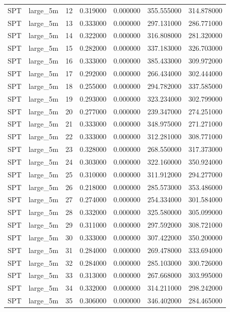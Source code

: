 \begin{tabular}{llrrrrr}
SPT & large_5m & 12 & 0.319000 & 0.000000 & 355.555000 & 314.878000 \\
SPT & large_5m & 13 & 0.333000 & 0.000000 & 297.131000 & 286.771000 \\
SPT & large_5m & 14 & 0.322000 & 0.000000 & 316.808000 & 281.320000 \\
SPT & large_5m & 15 & 0.282000 & 0.000000 & 337.183000 & 326.703000 \\
SPT & large_5m & 16 & 0.333000 & 0.000000 & 385.433000 & 309.972000 \\
SPT & large_5m & 17 & 0.292000 & 0.000000 & 266.434000 & 302.444000 \\
SPT & large_5m & 18 & 0.255000 & 0.000000 & 294.782000 & 337.585000 \\
SPT & large_5m & 19 & 0.293000 & 0.000000 & 323.234000 & 302.799000 \\
SPT & large_5m & 20 & 0.277000 & 0.000000 & 239.347000 & 274.251000 \\
SPT & large_5m & 21 & 0.333000 & 0.000000 & 348.975000 & 271.271000 \\
SPT & large_5m & 22 & 0.333000 & 0.000000 & 312.281000 & 308.771000 \\
SPT & large_5m & 23 & 0.328000 & 0.000000 & 268.550000 & 317.373000 \\
SPT & large_5m & 24 & 0.303000 & 0.000000 & 322.160000 & 350.924000 \\
SPT & large_5m & 25 & 0.310000 & 0.000000 & 311.912000 & 294.277000 \\
SPT & large_5m & 26 & 0.218000 & 0.000000 & 285.573000 & 353.486000 \\
SPT & large_5m & 27 & 0.274000 & 0.000000 & 254.334000 & 301.584000 \\
SPT & large_5m & 28 & 0.332000 & 0.000000 & 325.580000 & 305.099000 \\
SPT & large_5m & 29 & 0.311000 & 0.000000 & 297.592000 & 308.721000 \\
SPT & large_5m & 30 & 0.333000 & 0.000000 & 307.422000 & 350.200000 \\
SPT & large_5m & 31 & 0.284000 & 0.000000 & 269.478000 & 333.694000 \\
SPT & large_5m & 32 & 0.284000 & 0.000000 & 285.103000 & 300.726000 \\
SPT & large_5m & 33 & 0.313000 & 0.000000 & 267.668000 & 303.995000 \\
SPT & large_5m & 34 & 0.332000 & 0.000000 & 314.211000 & 298.242000 \\
SPT & large_5m & 35 & 0.306000 & 0.000000 & 346.402000 & 284.465000 \\

\end{tabular}
